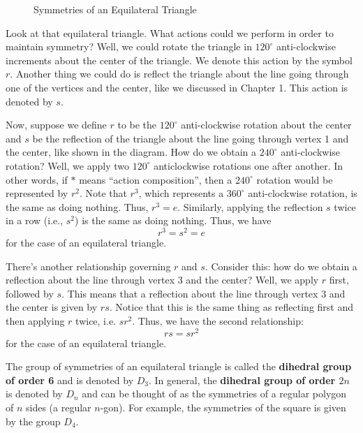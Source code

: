\begin{figure}[h]
    \centering
    \caption{Symmetries of an Equilateral Triangle}
\end{figure}

Look at that equilateral triangle. What actions could we perform in order to maintain symmetry? Well, we could rotate the triangle in $120^\circ$ anti-clockwise increments about the center of the triangle. We denote this action by the symbol $r$. Another thing we could do is reflect the triangle about the line going through one of the vertices and the center, like we discussed in Chapter 1. This action is denoted by $s$.

Now, suppose we define $r$ to be the $120^\circ$ anti-clockwise rotation about the center and $s$ be the reflection of the triangle about the line going through vertex 1 and the center, like shown in the diagram. How do we obtain a $240^\circ$ anti-clockwise rotation? Well, we apply two $120^\circ$ anticlockwise rotations one after another. In other words, if $\ast$ means ``action composition'', then a $240^\circ$ rotation would be represented by $r^2$. Note that $r^3$, which represents a $360^\circ$ anti-clockwise rotation, is the same as doing nothing. Thus, $r^3 = e$. Similarly, applying the reflection $s$ twice in a row (i.e., $s^2$) is the same as doing nothing. Thus, we have
\[
    r^3 = s^2 = e
\]
for the case of an equilateral triangle.

There's another relationship governing $r$ and $s$. Consider this: how do we obtain a reflection about the line through vertex 3 and the center? Well, we apply $r$ first, followed by $s$. This means that a reflection about the line through vertex 3 and the center is given by $rs$. Notice that this is the same thing as reflecting first and then applying $r$ twice, i.e. $sr^2$. Thus, we have the second relationship:
\[
    rs = sr^2
\]
for the case of an equilateral triangle.

The group of symmetries of an equilateral triangle is called the \textbf{dihedral group of order 6} and is denoted by $D_3$. In general, the \textbf{dihedral group of order $2n$} is denoted by $D_n$ and can be thought of as the symmetries of a regular polygon of $n$ sides (a regular $n$-gon). For example, the symmetries of the square is given by the group $D_4$.

